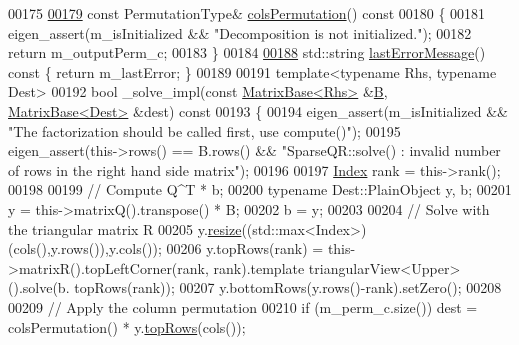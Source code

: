\begin{DoxyCode}
00175     
\hyperlink{group___sparse_q_r___module_a140930ebbf89dfd57a173761716db38f}{00179}     \textcolor{keyword}{const} PermutationType& \hyperlink{group___sparse_q_r___module_a140930ebbf89dfd57a173761716db38f}{colsPermutation}()\textcolor{keyword}{ const}
00180 \textcolor{keyword}{    }\{ 
00181       eigen\_assert(m\_isInitialized && \textcolor{stringliteral}{"Decomposition is not initialized."});
00182       \textcolor{keywordflow}{return} m\_outputPerm\_c;
00183     \}
00184     
\hyperlink{group___sparse_q_r___module_a1222e59649d77125d91f1368cf293c63}{00188}     std::string \hyperlink{group___sparse_q_r___module_a1222e59649d77125d91f1368cf293c63}{lastErrorMessage}()\textcolor{keyword}{ const }\{ \textcolor{keywordflow}{return} m\_lastError; \}
00189     
00191     \textcolor{keyword}{template}<\textcolor{keyword}{typename} Rhs, \textcolor{keyword}{typename} Dest>
00192     \textcolor{keywordtype}{bool} \_solve\_impl(\textcolor{keyword}{const} \hyperlink{group___core___module_class_eigen_1_1_matrix_base}{MatrixBase<Rhs>} &\hyperlink{group___core___module_class_eigen_1_1_matrix}{B}, \hyperlink{group___core___module_class_eigen_1_1_matrix_base}{MatrixBase<Dest>} &dest)\textcolor{keyword}{
       const}
00193 \textcolor{keyword}{    }\{
00194       eigen\_assert(m\_isInitialized && \textcolor{stringliteral}{"The factorization should be called first, use compute()"});
00195       eigen\_assert(this->rows() == B.rows() && \textcolor{stringliteral}{"SparseQR::solve() : invalid number of rows in the right
       hand side matrix"});
00196 
00197       \hyperlink{namespace_eigen_a62e77e0933482dafde8fe197d9a2cfde}{Index} rank = this->rank();
00198       
00199       \textcolor{comment}{// Compute Q^T * b;}
00200       \textcolor{keyword}{typename} Dest::PlainObject y, b;
00201       y = this->matrixQ().transpose() * B; 
00202       b = y;
00203       
00204       \textcolor{comment}{// Solve with the triangular matrix R}
00205       y.\hyperlink{group___core___module_a13027a493a68a13496610caf3d81bd3e}{resize}((std::max<Index>)(cols(),y.rows()),y.cols());
00206       y.topRows(rank) = this->matrixR().topLeftCorner(rank, rank).template triangularView<Upper>().solve(b.
      topRows(rank));
00207       y.bottomRows(y.rows()-rank).setZero();
00208       
00209       \textcolor{comment}{// Apply the column permutation}
00210       \textcolor{keywordflow}{if} (m\_perm\_c.size())  dest = colsPermutation() * y.\hyperlink{group___core___module_ad3e01f9216955704228eaeac0b442d24}{topRows}(cols());

\end{DoxyCode}

